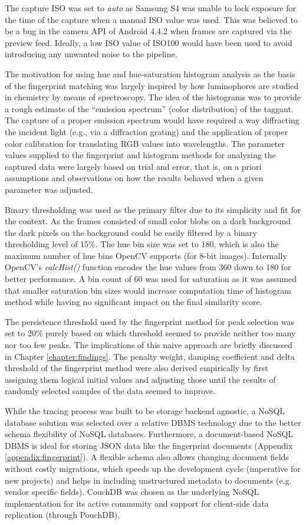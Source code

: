 \documentclass[thesis.tex]{subfiles}
\begin{document}
The capture ISO was set to \emph{auto} as Samsung S4 was unable to lock exposure for the time of the capture when a manual ISO value was used. This was believed to be a bug in the camera API of Android 4.4.2 when frames are captured via the preview feed. Ideally, a low ISO value of ISO100 would have been used to avoid introducing any unwanted noise to the pipeline.

The motivation for using hue and hue-saturation histogram analysis as the basis of the fingerprint matching was largely inspired by how luminophores are studied in chemistry by means of spectroscopy. The idea of the histograms was to provide a rough estimate of the ``emission spectrum'' (color distribution) of the taggant. The capture of a proper emission spectrum would have required a way diffracting the incident light (e.g., via a diffraction grating) and the application of proper color calibration for translating RGB values into wavelengths. The parameter values supplied to the fingerprint and histogram methods for analyzing the captured data were largely based on trial and error, that is, on a priori assumptions and observations on how the results behaved when a given parameter was adjusted.

Binary thresholding was used as the primary filter due to its simplicity and fit for the context. As the frames consisted of small color blobs on a dark background the dark pixels on the background could be easily filtered by a binary thresholding level of 15\%. The hue bin size was set to 180, which is also the maximum number of hue bins OpenCV supports (for 8-bit images). Internally OpenCV's \emph{calcHist()} function encodes the hue values from 360 down to 180 for better performance. A bin count of 60 was used for saturation as it was assumed that smaller saturation bin sizes would increase computation time of histogram method while having no significant impact on the final similarity score.

The persistence threshold used by the fingerprint method for peak selection was set to 20\% purely based on which threshold seemed to provide neither too many nor too few peaks. The implications of this naive approach are briefly discussed in Chapter \ref{chapter:findings}. The penalty weight, damping coefficient and delta threshold of the fingerprint method were also derived empirically by first assigning them logical initial values and adjusting those until the results of randomly selected samples of the data seemed to improve.

While the tracing process was built to be storage backend agnostic, a NoSQL database solution was selected over a relative DBMS technology due to the better schema flexibility of NoSQL databases. Furthermore, a document-based NoSQL DBMS is ideal for storing JSON data like the fingerprint documents (Appendix \ref{appendix:fingerprint}). A flexible schema also allows changing document fields without costly migrations, which speeds up the development cycle (imperative for new projects) and helps in including unstructured metadata to documents (e.g. vendor specific fields). CouchDB was chosen as the underlying NoSQL implementation for its active community and support for client-side data replication (through PouchDB).
\end{document}
